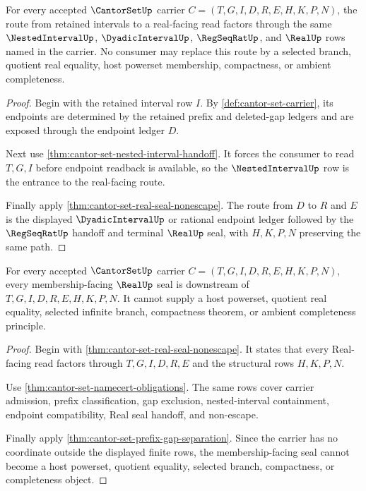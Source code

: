 \begin{theorem}
\label{thm:cantor-set-nested-real-handoff}
For every accepted $\CantorSetUp$ carrier $C=(T,G,I,D,R,E,H,K,P,N)$, the route from retained intervals to a real-facing read factors through the same $\NestedIntervalUp$, $\DyadicIntervalUp$, $\RegSeqRatUp$, and $\RealUp$ rows named in the carrier. No consumer may replace this route by a selected branch, quotient real equality, host powerset membership, compactness, or ambient completeness.
\end{theorem}
\begin{proof}
Begin with the retained interval row $I$. By \autoref{def:cantor-set-carrier}, its endpoints are determined by the retained prefix and deleted-gap ledgers and are exposed through the endpoint ledger $D$.

Next use \autoref{thm:cantor-set-nested-interval-handoff}. It forces the consumer to read $T,G,I$ before endpoint readback is available, so the $\NestedIntervalUp$ row is the entrance to the real-facing route.

Finally apply \autoref{thm:cantor-set-real-seal-nonescape}. The route from $D$ to $R$ and $E$ is the displayed $\DyadicIntervalUp$ or rational endpoint ledger followed by the $\RegSeqRatUp$ handoff and terminal $\RealUp$ seal, with $H,K,P,N$ preserving the same path.
\end{proof}

\begin{theorem}
\label{thm:cantor-set-real-seal-membership-boundary}
For every accepted $\CantorSetUp$ carrier $C=(T,G,I,D,R,E,H,K,P,N)$, every membership-facing $\RealUp$ seal is downstream of $T,G,I,D,R,E,H,K,P,N$. It cannot supply a host powerset, quotient real equality, selected infinite branch, compactness theorem, or ambient completeness principle.
\end{theorem}
\begin{proof}
Begin with \autoref{thm:cantor-set-real-seal-nonescape}. It states that every Real-facing read factors through $T,G,I,D,R,E$ and the structural rows $H,K,P,N$.

Use \autoref{thm:cantor-set-namecert-obligations}. The same rows cover carrier admission, prefix classification, gap exclusion, nested-interval containment, endpoint compatibility, Real seal handoff, and non-escape.

Finally apply \autoref{thm:cantor-set-prefix-gap-separation}. Since the carrier has no coordinate outside the displayed finite rows, the membership-facing seal cannot become a host powerset, quotient equality, selected branch, compactness, or completeness object.
\end{proof}

